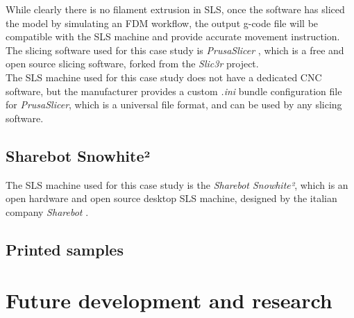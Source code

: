 \documentclass{article}
\begin{document}
        While clearly there is no filament extrusion in SLS, once the software has sliced the model by simulating 
        an FDM workflow, the output g-code file will be compatible with the SLS machine and provide 
        accurate movement instruction. \\

        The slicing software used for this case study is \textit{PrusaSlicer} \autocites{PrusaSlicer}, 
        which is a free and open source slicing software, forked from the \textit{Slic3r} project. \\

        The SLS machine used for this case study does not have a dedicated CNC software, but the 
        manufacturer provides a custom \textit{.ini} bundle configuration file for \textit{PrusaSlicer}, which is
        a universal file format, and can be used by any slicing software. \\
        
        
        \clearpage

        \subsection{Sharebot Snowhite²\label{Sharebot_Snowhite²}}

        The SLS machine used for this case study is the \textit{Sharebot Snowhite²}, which is an open hardware and 
        open source desktop SLS machine, designed by the italian company \textit{Sharebot} \autocites{Sharebot}. \\ 



        \clearpage
        \subsection{Printed samples\label{Printed_samples}}

        \clearpage

    \clearpage
    \section{Future development and research\label{Future_development_and_research}}

    

    

    
    
    











    \clearpage

    \printbibliography
\end{document}
